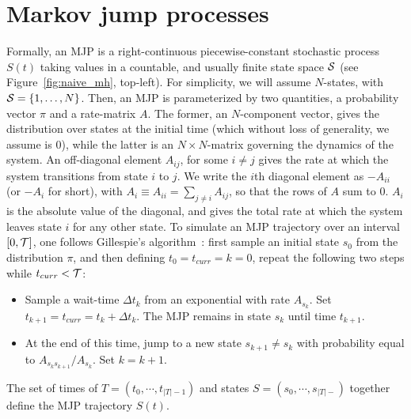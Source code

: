 \section{Markov jump processes}
Formally, an MJP is a right-continuous piecewise-constant stochastic
process $S(t)$ taking values in a countable, and usually finite state
space ${\mathcal S}$ (see Figure~\ref{fig:naive_mh}, top-left).
For simplicity, we will assume $N$-states, with ${\mathcal S} = \{1,\ldots,N\}$. Then, 
an MJP is parameterized by two quantities, a probability vector $\pi$ and a 
rate-matrix $A$. The former, an $N$-component vector, gives the 
distribution over states at the initial time (which without loss of 
generality, we assume is $0$), while the latter is an 
$N \times N$-matrix governing the dynamics of the system.  An 
off-diagonal element $A_{ij}$, for some $i \neq j$ gives the rate at 
which the system transitions from state $i$ to $j$. We write the 
$i$th diagonal element as $-A_{ii}$ (or $-A_i$ for short), with
$A_i \equiv A_{ii} = \sum_{j \neq i} A_{ij}$, 
so that the rows of $A$ sum to $0$.  $A_i$ is the absolute value of the diagonal,
and gives the total rate at which the system leaves state $i$ for any other state.
To simulate an MJP trajectory over an interval $[0,{\mathcal T}]$, one follows 
Gillespie's algorithm~\cite{gillespie97}: 
first sample an initial state $s_0$ from the distribution $\pi$, and
then defining $t_0 = t_{curr} = k = 0$, repeat the following two steps while
$t_{curr} < {\mathcal T}$:
\begin{itemize}
  \item Sample a wait-time $\Delta t_k$ from an exponential with rate $A_{s_k}$. 
    Set $t_{k+1} = t_{curr} = t_{k} + \Delta t_k$.
    The MJP remains in state $s_k$ until time $t_{k+1}$.
  \item At the end of this time, jump to a new state $s_{k+1} \neq s_k$ with 
    probability equal to $A_{s_ks_{k+1}}/A_{s_k}$. Set $k=k+1$.
\end{itemize}
The set of times of $T=(t_0, \cdots, t_{|T| - 1})$ and states 
$S=(s_0, \cdots, s_{|T| - })$ together define the MJP trajectory $S(t)$.

